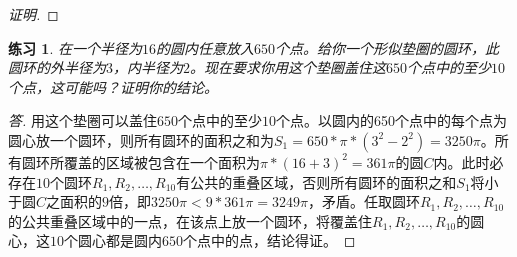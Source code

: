 \documentclass{book}[oneside]
\newtheorem{Exercise}{练习}[chapter]
\begin{document}
\begin{CJK*}{UTF8}{gbsn}
\begin{proof}[证明]
  \end{proof}
    \begin{Exercise}
    在一个半径为$16$的圆内任意放入$650$个点。给你一个形似垫圈的圆环，此圆环的外半径为$3$，内半径为$2$。现在要求你用这个垫圈盖住这$650$个点中的至少$10$个点，这可能吗？证明你的结论。
  \end{Exercise}
\begin{proof}[答]
  用这个垫圈可以盖住$650$个点中的至少$10$个点。以圆内的650个点中的每个点为圆心放一个圆环，则所有圆环的面积之和为$S_1 = 650 * \pi * (3^2 - 2^2) = 3250\pi$。所有圆环所覆盖的区域被包含在一个面积为$\pi * (16 + 3)^2= 361\pi$的圆$C$内。此时必存在$10$个圆环$R_1,R_2,\ldots, R_{10}$有公共的重叠区域，否则所有圆环的面积之和$S_1$将小于圆$C$之面积的$9$倍，即$3250\pi < 9 * 361\pi = 3249\pi$，矛盾。任取圆环$R_1,R_2,\ldots, R_{10}$的公共重叠区域中的一点，在该点上放一个圆环，将覆盖住$R_1,R_2,\ldots,R_{10}$的圆心，这$10$个圆心都是圆内$650$个点中的点，结论得证。 
\end{proof}




\end{CJK*}
\end{document}
